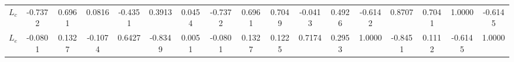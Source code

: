 \begin{center}
\begin{longtable}{lcccccccccccccccc}
${L_c}              $	 & 	              -0.7372	 & 	               0.6961	 & 	               0.0816	 & 	              -0.4351	 & 	               0.3913	 & 	               0.0454	 & 	              -0.7372	 & 	               0.6961	 & 	               0.7049	 & 	              -0.0413	 & 	               0.4926	 & 	              -0.6142	 & 	               0.8707	 & 	               0.7041	 & 	               1.0000	 & 	              -0.6145 \\ 
${L_e}              $	 & 	              -0.0801	 & 	               0.1327	 & 	              -0.1074	 & 	               0.6427	 & 	              -0.8349	 & 	               0.0051	 & 	              -0.0801	 & 	               0.1327	 & 	               0.1225	 & 	               0.7174	 & 	               0.2953	 & 	               1.0000	 & 	              -0.8451	 & 	               0.1112	 & 	              -0.6145	 & 	               1.0000 \\ 
\end{longtable}
 \end{center}

